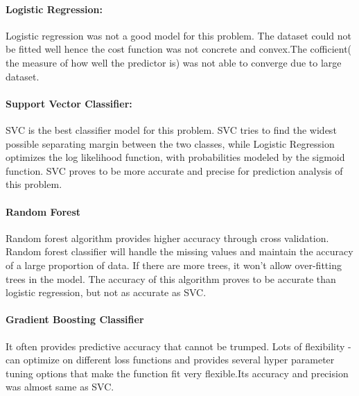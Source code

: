 \documentclass{article}
\begin{document}
\paragraph*{Logistic Regression:}
Logistic regression was not a good model for this problem. The dataset could not be fitted well hence the cost function was not concrete and convex.The cofficient( the measure of how well the predictor is) was not able to converge due to large dataset.
\paragraph*{Support Vector Classifier:}
SVC is the best classifier model for this problem. SVC tries to find the widest possible separating margin between the two classes, while Logistic Regression optimizes the log likelihood function, with probabilities modeled by the sigmoid function. SVC proves to be more accurate and precise for prediction analysis of this problem.
\paragraph*{Random Forest}
Random forest algorithm provides higher accuracy through cross validation. Random forest classifier will handle the missing values and maintain the accuracy of a large proportion of data. If there are more trees, it won't allow over-fitting trees in the model. 
The accuracy of this algorithm proves to be accurate than logistic regression, but not as accurate as SVC.
\paragraph*{Gradient Boosting Classifier}
It often provides predictive accuracy that cannot be trumped. Lots of flexibility - can optimize on different loss functions and provides several hyper parameter tuning options that make the function fit very flexible.Its accuracy and precision was almost same as SVC. 
\end{document}
